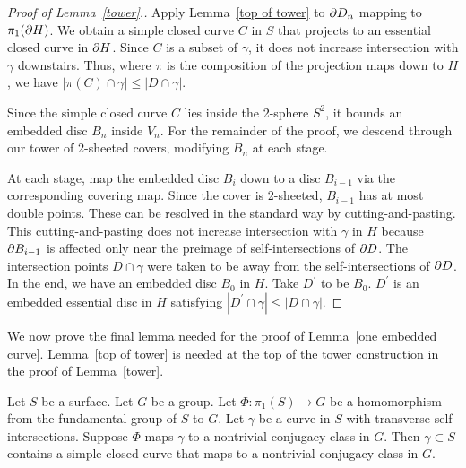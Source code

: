 \begin{proof}[Proof of Lemma~\ref{tower}.]

Apply Lemma~\ref{top of tower} to $\partial D_{n}$ mapping to $\pi_{1}(\partial H)$.  We obtain a simple closed curve $C$ in $S$ that projects to an essential closed curve in $\partial H$.  Since $C$ is a subset of $\gamma$, it does not increase intersection with $\gamma$ downstairs.  Thus, where $\pi$ is the composition of the projection maps down to $H$, we have $|\pi(C)\cap \gamma|\leq|D\cap\gamma|$.

Since the simple closed curve $C$ lies inside the 2-sphere $S^{2}$, it bounds an embedded disc $B_{n}$ inside $V_{n}$.  For the remainder of the proof, we descend through our tower of 2-sheeted covers, modifying $B_{n}$ at each stage.

At each stage, map the embedded disc $B_{i}$ down to a disc $B_{i-1}$ via the corresponding covering map.  Since the cover is 2-sheeted, $B_{i-1}$ has at most double points.  These can be resolved in the standard way by cutting-and-pasting.  This cutting-and-pasting does not increase intersection with $\gamma$ in $H$ because $\partial B_{i-1}$ is affected only near the preimage of self-intersections of $\partial D$.  The intersection points $D\cap\gamma$ were taken to be away from the self-intersections of $\partial D$.  In the end, we have an embedded disc $B_{0}$ in $H$.  Take $D^{\prime}$ to be $B_{0}$.  $D^{\prime}$ is an embedded essential disc in $H$ satisfying $|D^{\prime}\cap\gamma|\leq|D\cap\gamma|$.
\end{proof}

We now prove the final lemma needed for the proof of Lemma~\ref{one embedded curve}.  Lemma~\ref{top of tower} is needed at the top of the tower construction in the proof of Lemma~\ref{tower}.

\begin{lemma}
\label{top of tower}
Let $S$ be a surface.  Let $G$ be a group.  Let $\Phi:\pi_{1}(S)\rightarrow G$ be a homomorphism from the fundamental group of $S$ to $G$.  Let $\gamma$ be a curve in $S$ with transverse self-intersections.  Suppose $\Phi$ maps $\gamma$ to a nontrivial conjugacy class in $G$.  Then $\gamma\subset S$ contains a simple closed curve that maps to a nontrivial conjugacy class in $G$.
\end{lemma}

